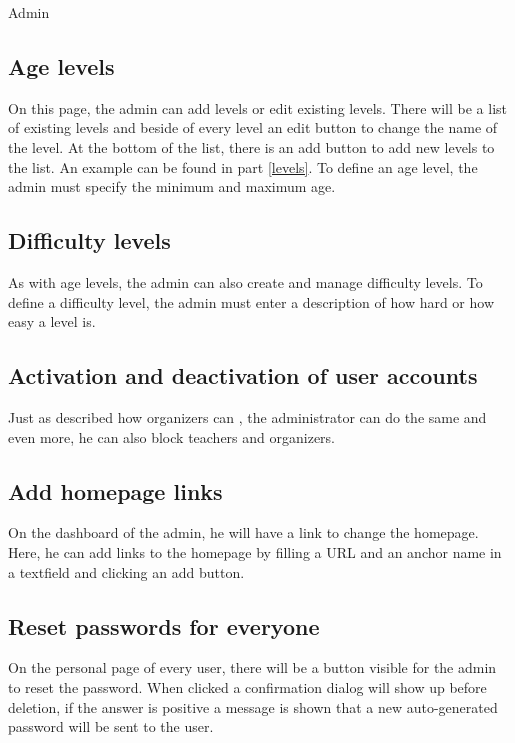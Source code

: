 \begin{section}{Admin}
\subsection{Age levels}
On this page, the admin can add levels or edit existing levels. There will be a list of existing levels and beside of every level an edit button to change the name of the level. At the bottom of the list, there is an add button to add new levels to the list. An example can be found in part \ref{levels}. To define an age level, the admin must specify the minimum and maximum age. 

\subsection{Difficulty levels}
As with age levels, the admin can also create and manage difficulty levels. To define a difficulty level, the admin must enter a description of how hard or how easy a level is.

\subsection{Activation and deactivation of user accounts}
Just as described how organizers can , the administrator can do the same and even more, he can also block teachers and organizers.

\subsection{Add homepage links}
On the dashboard of the admin, he will have a link to change the homepage. Here, he can add links to the homepage by filling a URL and an anchor name in a textfield and clicking an add button. 

\subsection{Reset passwords for everyone}
On the personal page of every user, there will be a button visible for the admin to reset the password. When clicked a confirmation dialog will show up before deletion, if the answer is positive a message is shown that a new auto-generated password will be sent to the user.

\end{section}
